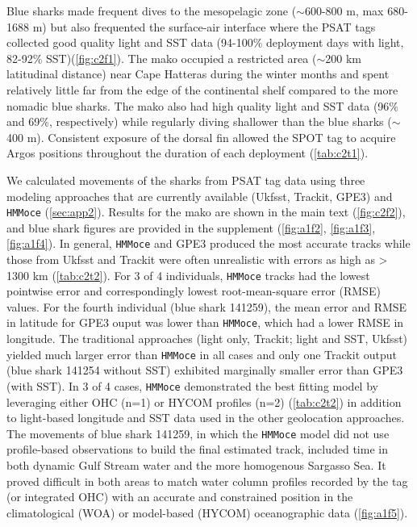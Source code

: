 Blue sharks made frequent dives to the mesopelagic zone
($\sim$600-800 m, max 680-1688 m) but also frequented the
surface-air interface where the PSAT tags collected good quality light
and SST data (94-100\% deployment days with light, 82-92\% SST)(\cref{fig:c2f1}). The mako occupied a restricted area
($\sim$200 km latitudinal distance) near Cape Hatteras during
the winter months and spent relatively little far from the edge of the
continental shelf compared to the more nomadic blue sharks. The mako
also had high quality light and SST data (96\% and 69\%, respectively)
while regularly diving shallower than the blue sharks
($\sim$400 m). Consistent exposure of the dorsal fin allowed
the SPOT tag to acquire Argos positions throughout the duration of each
deployment (\cref{tab:c2t1}).

We calculated movements of the sharks from PSAT tag data using three
modeling approaches that are currently available (Ukfsst, Trackit, GPE3)
and \texttt{HMMoce} (\cref{sec:app2}). Results for the mako are shown in the
main text (\cref{fig:c2f2}), and blue shark figures are
provided in the supplement (\cref{fig:a1f2}, \cref{fig:a1f3}, \cref{fig:a1f4}). In general,
\texttt{HMMoce} and GPE3 produced the most accurate tracks while those
from Ukfsst and Trackit were often unrealistic with errors as high as
> 1300 km (\cref{tab:c2t2}). For 3 of 4 individuals, \texttt{HMMoce}
tracks had the lowest pointwise error and correspondingly lowest
root-mean-square error (RMSE) values. For the fourth individual (blue
shark 141259), the mean error and RMSE in latitude for GPE3 ouput was
lower than \texttt{HMMoce}, which had a lower RMSE in longitude. The
traditional approaches (light only, Trackit; light and SST, Ukfsst)
yielded much larger error than \texttt{HMMoce} in all cases and only one
Trackit output (blue shark 141254 without SST) exhibited marginally
smaller error than GPE3 (with SST). In 3 of 4 cases, \texttt{HMMoce}
demonstrated the best fitting model by leveraging either OHC (n=1) or
HYCOM profiles (n=2) (\cref{tab:c2t2}) in addition to light-based longitude and
SST data used in the other geolocation approaches. The movements of blue
shark 141259, in which the \texttt{HMMoce} model did not use
profile-based observations to build the final estimated track, included
time in both dynamic Gulf Stream water and the more homogenous Sargasso
Sea. It proved difficult in both areas to match water column profiles
recorded by the tag (or integrated OHC) with an accurate and constrained
position in the climatological (WOA) or model-based (HYCOM)
oceanographic data (\cref{fig:a1f5}).

